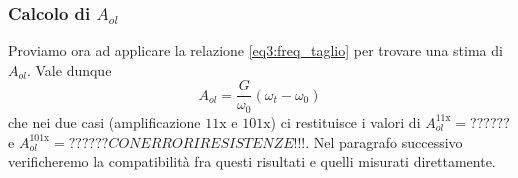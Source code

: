 \subsubsection{Calcolo di $A_{ol}$}

Proviamo ora ad applicare la relazione \ref{eq3:freq_taglio} per trovare una stima di $A_{ol}$. Vale dunque
$$A_{ol} = \frac{G}{\omega_0} (\omega_t - \omega_0)$$
che nei due casi (amplificazione $11\mathrm{x}$ e $101\mathrm{x}$) ci restituisce i valori di $A_{ol}^{11\mathrm{x}} = ??????$ e $A_{ol}^{101\mathrm{x}} = ?????? CON ERRORI RESISTENZE!!!$. Nel paragrafo successivo verificheremo la compatibilità fra questi risultati e quelli misurati direttamente.